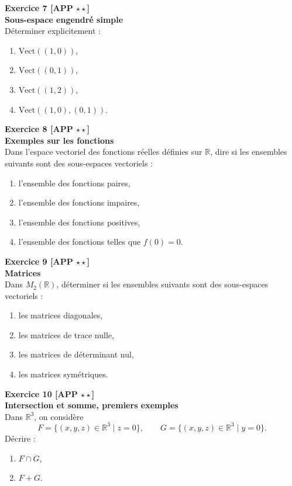 \documentclass[11pt,a4paper]{article}
\begin{document}
\textbf{Exercice 7 [APP $\star\star$]}\\
\textbf{Sous-espace engendré simple}\\
Déterminer explicitement :
\begin{enumerate}[label=\alph*)]
    \item $\mathrm{Vect}((1,0))$,
    \item $\mathrm{Vect}((0,1))$,
    \item $\mathrm{Vect}((1,2))$,
    \item $\mathrm{Vect}((1,0),(0,1))$.
\end{enumerate}

\textbf{Exercice 8 [APP $\star\star$]}\\
\textbf{Exemples sur les fonctions}\\
Dans l’espace vectoriel des fonctions réelles définies sur $\mathbb{R}$, dire si les ensembles suivants sont des sous-espaces vectoriels :
\begin{enumerate}[label=\alph*)]
    \item l’ensemble des fonctions paires,
    \item l’ensemble des fonctions impaires,
    \item l’ensemble des fonctions positives,
    \item l’ensemble des fonctions telles que $f(0)=0$.
\end{enumerate}

\textbf{Exercice 9 [APP $\star\star$]}\\
\textbf{Matrices}\\
Dans $M_2(\mathbb{R})$, déterminer si les ensembles suivants sont des sous-espaces vectoriels :
\begin{enumerate}[label=\alph*)]
    \item les matrices diagonales,
    \item les matrices de trace nulle,
    \item les matrices de déterminant nul,
    \item les matrices symétriques.
\end{enumerate}

\textbf{Exercice 10 [APP $\star\star$]}\\
\textbf{Intersection et somme, premiers exemples}\\
Dans $\mathbb{R}^3$, on considère
\[
F=\{(x,y,z)\in\mathbb{R}^3\mid z=0\},\qquad
G=\{(x,y,z)\in\mathbb{R}^3\mid y=0\}.
\]
Décrire :
\begin{enumerate}[label=\alph*)]
    \item $F\cap G$,
    \item $F+G$.
\end{enumerate}
\end{document}
